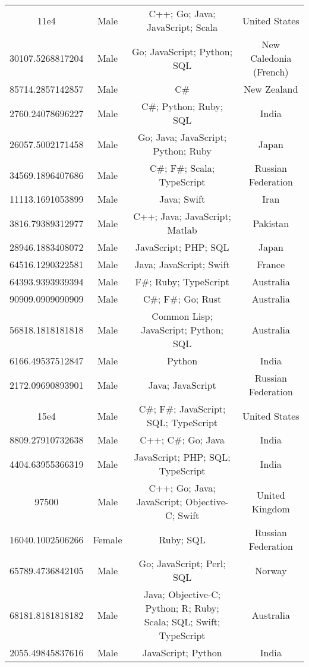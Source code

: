 \begin{center}
\begin{tabular}{ |c|c|c|c| }
11e4  &  Male  &  C++; Go; Java; JavaScript; Scala  &  United States  \\ 
30107.5268817204  &  Male  &  Go; JavaScript; Python; SQL  &  New Caledonia (French)  \\ 
85714.2857142857  &  Male  &  C\#  &  New Zealand  \\ 
2760.24078696227  &  Male  &  C\#; Python; Ruby; SQL  &  India  \\ 
26057.5002171458  &  Male  &  Go; Java; JavaScript; Python; Ruby  &  Japan  \\ 
34569.1896407686  &  Male  &  C\#; F\#; Scala; TypeScript  &  Russian Federation  \\ 
11113.1691053899  &  Male  &  Java; Swift  &  Iran  \\ 
3816.79389312977  &  Male  &  C++; Java; JavaScript; Matlab  &  Pakistan  \\ 
28946.1883408072  &  Male  &  JavaScript; PHP; SQL  &  Japan  \\ 
64516.1290322581  &  Male  &  Java; JavaScript; Swift  &  France  \\ 
64393.9393939394  &  Male  &  F\#; Ruby; TypeScript  &  Australia  \\ 
90909.0909090909  &  Male  &  C\#; F\#; Go; Rust  &  Australia  \\ 
56818.1818181818  &  Male  &  Common Lisp; JavaScript; Python; SQL  &  Australia  \\ 
6166.49537512847  &  Male  &  Python  &  India  \\ 
2172.09690893901  &  Male  &  Java; JavaScript  &  Russian Federation  \\ 
15e4  &  Male  &  C\#; F\#; JavaScript; SQL; TypeScript  &  United States  \\ 
8809.27910732638  &  Male  &  C++; C\#; Go; Java  &  India  \\ 
4404.63955366319  &  Male  &  JavaScript; PHP; SQL; TypeScript  &  India  \\ 
97500  &  Male  &  C++; Go; Java; JavaScript; Objective-C; Swift  &  United Kingdom  \\ 
16040.1002506266  &  Female  &  Ruby; SQL  &  Russian Federation  \\ 
65789.4736842105  &  Male  &  Go; JavaScript; Perl; SQL  &  Norway  \\ 
68181.8181818182  &  Male  &  Java; Objective-C; Python; R; Ruby; Scala; SQL; Swift; TypeScript  &  Australia  \\ 
2055.49845837616  &  Male  &  JavaScript; Python  &  India  \\ 

\end{tabular}
\end{center}
